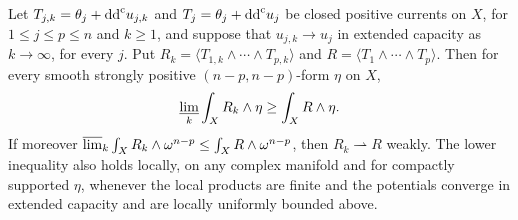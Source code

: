 \begin{theorem}\label{thm:nonpluripolar-capacity-lower-limit}
Let $T_{j,k}=\theta_j+\mathrm{dd}^{\mathrm{c}} u_{j,k}$ and $T_j=\theta_j+\mathrm{dd}^{\mathrm{c}} u_j$ be closed positive currents on $X$, for $1\leq j\leq p\leq n$ and $k\geq1$, and suppose that $u_{j,k}\to u_j$ in extended capacity as $k\to\infty$, for every $j$. Put $R_k=\langle T_{1,k}\wedge\cdots\wedge T_{p,k}\rangle$ and $R=\langle T_1\wedge\cdots\wedge T_p\rangle$. Then for every smooth strongly positive $(n-p,n-p)$-form $\eta$ on $X$,
\[
 \varliminf_k\int_X R_k\wedge\eta\geq\int_X R\wedge\eta.
\]
If moreover $\varlimsup_k\int_X R_k\wedge\omega^{n-p}\leq\int_X R\wedge\omega^{n-p}$, then $R_k\rightharpoonup R$ weakly. The lower inequality also holds locally, on any complex manifold and for compactly supported $\eta$, whenever the local products are finite and the potentials converge in extended capacity and are locally uniformly bounded above.
\end{theorem}
